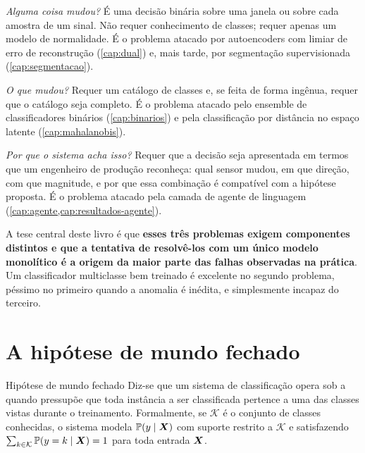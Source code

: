 \begin{description}[leftmargin=0pt,style=nextline,itemsep=0.6em]

\item[Detecção.] \emph{Alguma coisa mudou?} É uma decisão binária sobre uma janela ou
sobre cada amostra de um sinal. Não requer conhecimento de classes; requer apenas um
modelo de normalidade. É o problema atacado por autoencoders com limiar de erro de
reconstrução (\cref{cap:dual}) e, mais tarde, por segmentação supervisionada
(\cref{cap:segmentacao}).

\item[Classificação.] \emph{O que mudou?} Requer um catálogo de classes e, se feita de
forma ingênua, requer que o catálogo seja completo. É o problema atacado pelo ensemble
de classificadores binários (\cref{cap:binarios}) e pela classificação por distância no
espaço latente (\cref{cap:mahalanobis}).

\item[Explicação.] \emph{Por que o sistema acha isso?} Requer que a decisão seja
apresentada em termos que um engenheiro de produção reconheça: qual sensor mudou, em
que direção, com que magnitude, e por que essa combinação é compatível com a hipótese
proposta. É o problema atacado pela camada de agente de linguagem
(\cref{cap:agente,cap:resultados-agente}).

\end{description}

A tese central deste livro é que \textbf{esses três problemas exigem componentes
distintos e que a tentativa de resolvê-los com um único modelo monolítico é a origem
da maior parte das falhas observadas na prática}. Um classificador multiclasse bem
treinado é excelente no segundo problema, péssimo no primeiro quando a anomalia é
inédita, e simplesmente incapaz do terceiro.

\section{A hipótese de mundo fechado}

\begin{definicao}{Hipótese de mundo fechado}
Diz-se que um sistema de classificação opera sob a  quando pressupõe que toda instância a ser
classificada pertence a uma das classes vistas durante o treinamento. Formalmente, se
$\mathcal{K}$ é o conjunto de classes conhecidas, o sistema modela
$\mathbb{P}(y \mid \bm{X})$ com suporte restrito a $\mathcal{K}$ e satisfazendo
$\sum_{k \in \mathcal{K}} \mathbb{P}(y = k \mid \bm{X}) = 1$ para toda entrada $\bm{X}$.
\end{definicao}

